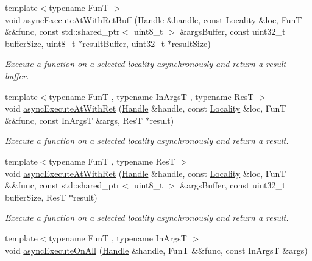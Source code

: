 \begin{DoxyCompactItemize}
{\footnotesize template$<$typename Fun\-T $>$ }\\void \hyperlink{namespaceshad_1_1rt_a112df602ea3878eab5f2d2ed424d8d87}{async\-Execute\-At\-With\-Ret\-Buff} (\hyperlink{classshad_1_1rt_1_1Handle}{Handle} \&handle, const \hyperlink{classshad_1_1rt_1_1Locality}{Locality} \&loc, Fun\-T \&\&func, const std\-::shared\-\_\-ptr$<$ uint8\-\_\-t $>$ \&args\-Buffer, const uint32\-\_\-t buffer\-Size, uint8\-\_\-t $\ast$result\-Buffer, uint32\-\_\-t $\ast$result\-Size)
\begin{DoxyCompactList}\small\item\em Execute a function on a selected locality asynchronously and return a result buffer. \end{DoxyCompactList}\item 
{\footnotesize template$<$typename Fun\-T , typename In\-Args\-T , typename Res\-T $>$ }\\void \hyperlink{namespaceshad_1_1rt_a5ef970b04fc171862dc8b0c4cb6308d4}{async\-Execute\-At\-With\-Ret} (\hyperlink{classshad_1_1rt_1_1Handle}{Handle} \&handle, const \hyperlink{classshad_1_1rt_1_1Locality}{Locality} \&loc, Fun\-T \&\&func, const In\-Args\-T \&args, Res\-T $\ast$result)
\begin{DoxyCompactList}\small\item\em Execute a function on a selected locality asynchronously and return a result. \end{DoxyCompactList}\item 
{\footnotesize template$<$typename Fun\-T , typename Res\-T $>$ }\\void \hyperlink{namespaceshad_1_1rt_a52c8bfa7986d1786079e81e772a9d425}{async\-Execute\-At\-With\-Ret} (\hyperlink{classshad_1_1rt_1_1Handle}{Handle} \&handle, const \hyperlink{classshad_1_1rt_1_1Locality}{Locality} \&loc, Fun\-T \&\&func, const std\-::shared\-\_\-ptr$<$ uint8\-\_\-t $>$ \&args\-Buffer, const uint32\-\_\-t buffer\-Size, Res\-T $\ast$result)
\begin{DoxyCompactList}\small\item\em Execute a function on a selected locality asynchronously and return a result. \end{DoxyCompactList}\item 
{\footnotesize template$<$typename Fun\-T , typename In\-Args\-T $>$ }\\void \hyperlink{namespaceshad_1_1rt_a35ae5113d8da4942705af0a77305fe0c}{async\-Execute\-On\-All} (\hyperlink{classshad_1_1rt_1_1Handle}{Handle} \&handle, Fun\-T \&\&func, const In\-Args\-T \&args)

\end{DoxyCompactItemize}
